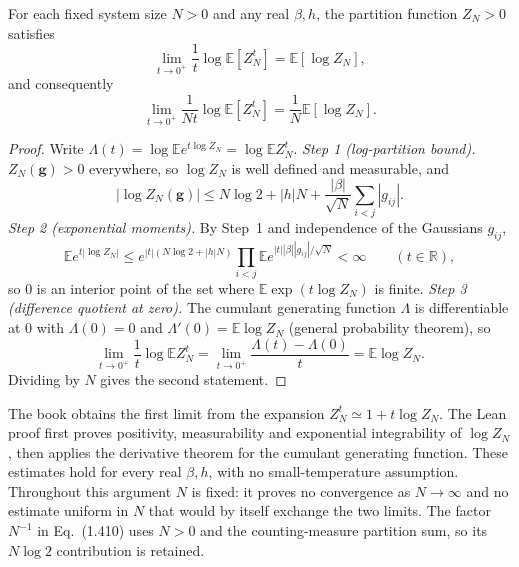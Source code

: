 \begin{theorem}\label{thm:sg-tal:replica-real-moments}
\leanok
{}
For each fixed system size $N > 0$ and any real $\beta, h$, the partition function $Z_N > 0$ satisfies
\[
\lim_{t \to 0^+} \frac{1}{t} \log \mathbb E [Z_N^t] = \mathbb E [\log Z_N],
\]
and consequently
\[
\lim_{t \to 0^+} \frac{1}{N t} \log \mathbb E [Z_N^t] = \frac{1}{N} \mathbb E [\log Z_N].
\]
\end{theorem}
\begin{proof}
\leanok
Write $\Lambda(t)=\log\mathbb Ee^{t\log Z_N}=\log\mathbb EZ_N^t$.
\emph{Step 1 (log-partition bound).} $Z_N(\mathbf g)>0$ everywhere, so $\log Z_N$ is well defined and measurable, and
\[
|\log Z_N(\mathbf g)|\le N\log2+|h|N+\frac{|\beta|}{\sqrt N}\sum_{i<j}|g_{ij}| .
\]
\emph{Step 2 (exponential moments).} By Step~1 and independence of the Gaussians $g_{ij}$,
\[
\mathbb Ee^{t|\log Z_N|}\le e^{|t|(N\log2+|h|N)}\prod_{i<j}\mathbb Ee^{|t||\beta||g_{ij}|/\sqrt N}<\infty\qquad(t\in\mathbb R),
\]
so $0$ is an interior point of the set where $\mathbb E\exp(t\log Z_N)$ is finite.
\emph{Step 3 (difference quotient at zero).} The cumulant generating function $\Lambda$ is differentiable at $0$ with $\Lambda(0)=0$ and $\Lambda'(0)=\mathbb E\log Z_N$ (general probability theorem), so
\[
\lim_{t\to0^+}\frac1t\log\mathbb EZ_N^t=\lim_{t\to0^+}\frac{\Lambda(t)-\Lambda(0)}t=\mathbb E\log Z_N .
\]
Dividing by $N$ gives the second statement.
\end{proof}

\begin{remark}\label{rem:sg-tal:replica-real-moments-comparison}
The book obtains the first limit from the expansion $Z_N^t\simeq1+t\log Z_N$.
The Lean proof first proves positivity, measurability and exponential integrability of
$\log Z_N$, then applies the derivative theorem for the cumulant generating function.
These estimates hold for every real $\beta,h$, with no small-temperature assumption.
Throughout this argument $N$ is fixed: it proves no convergence as $N\to\infty$ and no
estimate uniform in $N$ that would by itself exchange the two limits.
The factor $N^{-1}$ in Eq.~(1.410) uses $N>0$ and the counting-measure partition sum,
so its $N\log2$ contribution is retained.
\end{remark}

